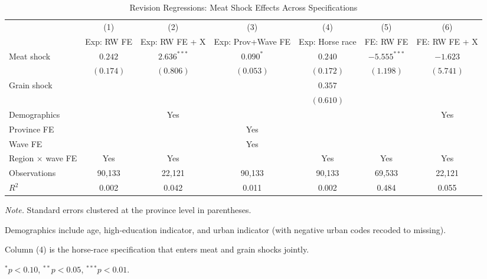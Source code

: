 \begin{table}[!htbp]
\centering
\caption{Revision Regressions: Meat Shock Effects Across Specifications}
\label{tab:revision_regressions}
\begin{threeparttable}
\begin{tabular}{lcccccc}
\toprule
& (1) & (2) & (3) & (4) & (5) & (6) \\
& Exp: RW FE & Exp: RW FE + X & Exp: Prov+Wave FE & Exp: Horse race & FE: RW FE & FE: RW FE + X \\
\midrule
Meat shock & $0.242$ & $2.636^{***}$ & $0.090^{*}$ & $0.240$ & $-5.555^{***}$ & $-1.623$ \\
& $(0.174)$ & $(0.806)$ & $(0.053)$ & $(0.172)$ & $(1.198)$ & $(5.741)$ \\[4pt]
Grain shock &  &  &  & $0.357$ &  &  \\
&  &  &  & $(0.610)$ &  &  \\[4pt]
\midrule
Demographics &  & Yes &  &  &  & Yes \\
Province FE &  &  & Yes &  &  &  \\
Wave FE &  &  & Yes &  &  &  \\
Region $\times$ wave FE & Yes & Yes &  & Yes & Yes & Yes \\
Observations & 90,133 & 22,121 & 90,133 & 90,133 & 69,533 & 22,121 \\
$R^2$ & 0.002 & 0.042 & 0.011 & 0.002 & 0.484 & 0.055 \\
\bottomrule
\end{tabular}
\begin{tablenotes}[flushleft]
\footnotesize
\item \textit{Note.} Standard errors clustered at the province level in parentheses.
\item Demographics include age, high-education indicator, and urban indicator (with negative urban codes recoded to missing).
\item Column (4) is the horse-race specification that enters meat and grain shocks jointly.
\item $^{*}p<0.10$, $^{**}p<0.05$, $^{***}p<0.01$.
\end{tablenotes}
\end{threeparttable}
\end{table}
